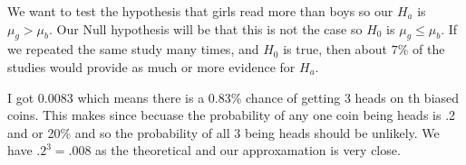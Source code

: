 \documentclass[11pt,largemargins]{homework}
\begin{document}
\maketitle

\question
\begin{alphaparts}
    \questionpart
    We want to test the hypothesis that girls read more than boys so our $H_a$ is $\mu_g > \mu_b$. Our 
    Null hypothesis will be that this is not the case so $H_0$ is $\mu_g \leq \mu_b$. 
    \questionpart 
    If we repeated the same study many times, and $H_0$ is true, then about $7\%$
    of the studies would provide as much or more evidence for $H_a$. 


    
\end{alphaparts}
\question
I got 0.0083 which means there is a 0.83\% chance of getting 3 heads on th biased coins. This makes since becuase the probability of any one coin being heads is .2 and 
or 20\% and so the probability of all 3 being heads should be unlikely. We have $.2^3 = .008$ as the theoretical and our approxamation is very close. 




\end{document}
